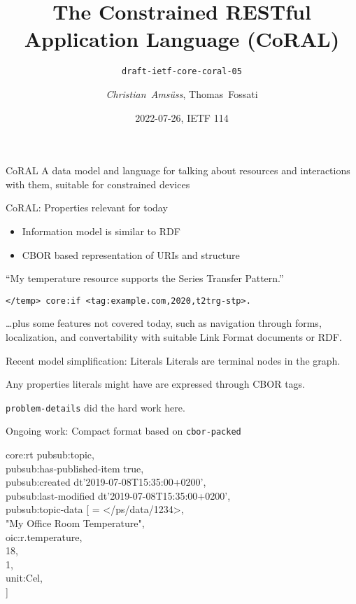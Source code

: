 \documentclass[aspectratio=169,colorlinks]{beamer}
\title[CoRAL]{The Constrained RESTful Application Language (CoRAL)}
\subtitle{\texttt{draft-ietf-core-coral-05}}
\author{\textit{Christian~Amsüss}, Thomas~Fossati}
\date{2022-07-26, IETF 114}
\begin{document}
\frame{\titlepage}

\begin{frame}{CoRAL}\Large
	A data model and language for talking about resources and interactions with them,
	suitable for constrained devices
\end{frame}

\begin{frame}{CoRAL: Properties relevant for today}\Large
	\begin{itemize}
		\item Information model is similar to RDF

		\item CBOR based representation of URIs and structure

	\end{itemize}

	\vfill

	``{\color{red}My temperature resource} {\color{darkgreen}supports} {\color{blue}the Series Transfer Pattern}.''

	\texttt{{\color{red}</temp>} {\color{darkgreen}core:if} {\color{blue}<tag:example.com,2020,t2trg-stp>}.}

	\vfill

	\normalsize \ldots plus some features not covered today, such as navigation through forms, localization, and convertability with suitable Link Format documents or RDF.
\end{frame}

\begin{frame}{Recent model simplification: Literals}\Large
	Literals are terminal nodes in the graph.

	Any properties literals might have are expressed through CBOR tags.

	\bigskip

	\texttt{problem-details} did the hard work here.
\end{frame}

\begin{frame}{Ongoing work: Compact format based on \texttt{cbor-packed}}\Large
	\ttfamily

	{\color{darkgreen}core:rt} {\color{blue}pubsub:topic}, \\
	{\color{blue}pubsub:has-published-item} true, \\
	{\color{blue}pubsub:created} dt'2019-07-08T15:35:00+0200', \\
	{\color{blue}pubsub:last-modified} dt'2019-07-08T15:35:00+0200', \\

	{\color{blue}pubsub:topic-data} [ = </ps/data/1234>, \\
	               "My Office Room Temperature", \\
	                  {\color{blue}oic:r.temperature}, \\
	            18, \\
	               1, \\
	 {\color{magenta}unit:Cel}, \\
        ]

\end{frame}
\end{document}
